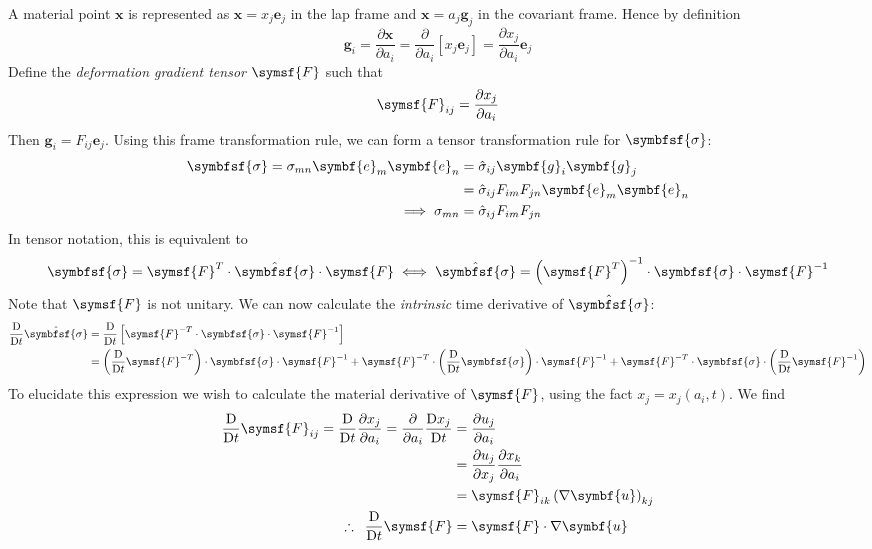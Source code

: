 \documentclass{jknotes}
\begin{document}
A material point $\symbf{x}$ is represented as $\symbf{x} = x_j \symbf{e}_j$
in the lap frame and $\symbf{x} = a_j \symbf{g}_j$ in the covariant frame.
Hence by definition
\begin{equation}
	\symbf{g}_i = \frac{\partial \symbf{x}}{\partial a_i} =
	\frac{\partial}{\partial a_i} \left[ x_j \symbf{e}_j\right] =
	\frac{\partial x_j}{\partial a_i} \symbf{e}_j
\end{equation}
Define the \emph{deformation gradient tensor} $\symsf{F}$ such that
\begin{equation}
	\symsf{F}_{ij} = \frac{\partial x_j}{\partial a_i}
\end{equation}
Then $\symbf{g}_i = F_{ij} \symbf{e}_j$. Using this frame transformation rule,
we can form a tensor transformation rule for $\symbfsf{\sigma}$:
\begin{align}
	\symbfsf{\sigma} = \sigma_{mn} \symbf{e}_m \symbf{e}_n &= \hat{\sigma}_{ij}
	\symbf{g}_i \symbf{g}_j  \\
	&= \hat{\sigma}_{ij} F_{im} F_{jn} \symbf{e}_m \symbf{e}_n \\
	\implies \sigma_{mn} &= \hat{\sigma}_{ij} F_{im} F_{jn}
\end{align}
In tensor notation, this is equivalent to
\begin{equation}
	\symbfsf{\sigma} = \symsf{F}^T \cdot \hat{\symbfsf{\sigma}} \cdot
	\symsf{F} \iff \hat{\symbfsf{\sigma}} = \left( \symsf{F}^T\right)^{-1}
	\cdot \symbfsf{\sigma} \cdot \symsf{F}^{-1}
\end{equation}
Note that $\symsf{F}$ is not unitary. We can now calculate the
\emph{intrinsic} time derivative of $\hat{\symbfsf{\sigma}}$:
\begin{align}
	\frac{\diffD}{\diffD t} \hat{\symbfsf{\sigma}} &= \frac{\diffD}{\diffD t}
	\left[ \symsf{F}^{-T} \cdot \symbfsf{\sigma} \cdot \symsf{F}^{-1}\right]
	\\
	&= \left( \frac{\diffD}{\diffD t} \symsf{F}^{-T}\right) \cdot
	\symbfsf{\sigma} \cdot \symsf{F}^{-1} + \symsf{F}^{-T} \cdot \left(
	\frac{\diffD}{\diffD t} \symbfsf{\sigma}\right) \cdot \symsf{F}^{-1} +
	\symsf{F}^{-T} \cdot \symbfsf{\sigma}  \cdot \left( \frac{\diffD}{\diffD
	t} \symsf{F}^{-1}\right)
\end{align}
To elucidate this expression we wish to calculate the material derivative of
$\symsf{F}$, using the fact $x_j = x_j(a_i,t)$. We find
\begin{align}
	\frac{\diffD}{\diffD t} \symsf{F}_{ij} = \frac{\diffD}{\diffD t}
	\frac{\partial x_j}{\partial a_i} = \frac{\partial}{\partial a_i}
	\frac{\diffD x_j}{\diffD t} &= \frac{\partial u_j}{\partial a_i} \\
						&=
	\frac{\partial u_j}{\partial x_j} \frac{\partial x_k}{\partial a_i} \\
	&= \symsf{F}_{ik} \left(\nabla \symbf{u}\right)_{kj}\\
	\therefore\,\,\, \frac{\diffD}{\diffD t} \symsf{F} &= \symsf{F} \cdot \nabla
	\symbf{u}
\end{align}
\end{document}

